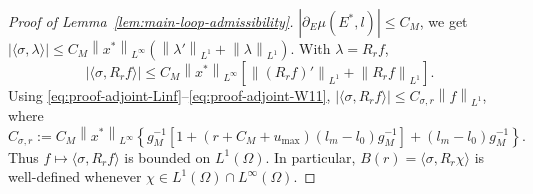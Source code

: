 \documentclass[pdflatex,sn-mathphys-num]{sn-jnl}
\theoremstyle{thmstyleone}
\theoremstyle{definition}
\theoremstyle{remark}
\newcommand{\Om}{\Omega}
\newcommand{\norm}[1]{\left\lVert#1\right\rVert}
\newcommand{\abs}[1]{\left\lvert#1\right\rvert}
\numberwithin{equation}{section}
\begin{document}
\begin{proof}[Proof of Lemma~\ref{lem:main-loop-admissibility}]
$\abs{\partial_E\mu(E^*,l)}\le C_M$,
we get
$\displaystyle 
\abs{\langle\sigma,\lambda\rangle}
\le
C_M\norm{x^*}_{L^\infty}
\left(
\norm{\lambda'}_{L^1}
+
\norm{\lambda}_{L^1}
\right)$.
With \(\lambda=R_rf\),
\[
\abs{\langle\sigma,R_rf\rangle}
\le
C_M\norm{x^*}_{L^\infty}
\left[
\norm{(R_rf)'}_{L^1}
+
\norm{R_rf}_{L^1}
\right].
\]
Using \eqref{eq:proof-adjoint-Linf}--\eqref{eq:proof-adjoint-W11},
$\displaystyle 
\abs{\langle\sigma,R_rf\rangle}
\le
C_{\sigma,r}\norm{f}_{L^1}$,
where
\[
C_{\sigma,r}
:=
C_M\norm{x^*}_{L^\infty}
\left\{
g_M^{-1}
\left[
1+(r+C_M+u_{\max})(l_m-l_0)g_M^{-1}
\right]
+
(l_m-l_0)g_M^{-1}
\right\}.
\]
Thus
$\displaystyle 
f\mapsto\langle\sigma,R_rf\rangle$
is bounded on \(L^1(\Om)\). In particular,
$\displaystyle 
B(r)=\langle\sigma,R_r\chi\rangle$
is well-defined whenever \(\chi\in L^1(\Om)\cap L^\infty(\Om)\).
\end{proof}
\end{document}

